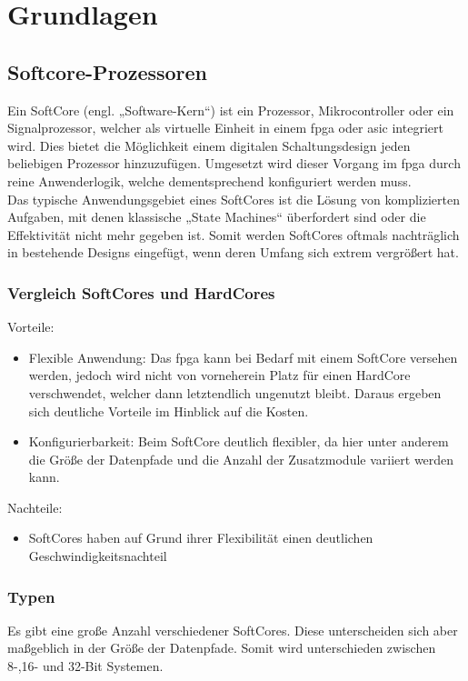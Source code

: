 \chapter{Grundlagen}\label{kap:grundlagen}
\section{Softcore-Prozessoren}\label{kap:softcoreprozessoren}

Ein SoftCore (engl. „Software-Kern“) ist ein Prozessor, Mikrocontroller oder ein Signalprozessor, welcher als virtuelle Einheit in einem \ac{fpga} oder \ac{asic} integriert wird.
Dies bietet die Möglichkeit einem digitalen Schaltungsdesign jeden beliebigen Prozessor hinzuzufügen. Umgesetzt wird dieser Vorgang im \ac{fpga} durch reine Anwenderlogik,
welche dementsprechend konfiguriert werden muss.\\
Das typische Anwendungsgebiet eines SoftCores ist die Lösung von komplizierten Aufgaben, mit denen klassische „State Machines“ überfordert sind oder die Effektivität
 nicht mehr gegeben ist. Somit werden SoftCores oftmals nachträglich in bestehende Designs eingefügt, wenn deren Umfang sich extrem vergrößert hat.\cite{softcore}\\

\subsection{Vergleich SoftCores und HardCores}\label{kap:vergleich}
Vorteile:
\begin{itemize}
   \item Flexible Anwendung: Das \ac{fpga} kann bei Bedarf mit einem SoftCore versehen werden, jedoch wird nicht von vorneherein Platz für einen HardCore verschwendet, welcher
    dann letztendlich ungenutzt bleibt. Daraus ergeben sich deutliche Vorteile im Hinblick auf die Kosten.
    \item Konfigurierbarkeit: Beim SoftCore deutlich flexibler, da hier unter anderem die Größe der Datenpfade und die Anzahl der Zusatzmodule variiert werden kann.
 \end{itemize}


Nachteile:
\begin{itemize}
  \item SoftCores haben auf Grund ihrer Flexibilität einen deutlichen Geschwindigkeitsnachteil
\end{itemize}

\subsection{Typen}\label{kap:typen}
Es gibt eine große Anzahl verschiedener SoftCores. Diese unterscheiden sich aber maßgeblich in der Größe der Datenpfade.
Somit wird unterschieden zwischen 8-,16- und 32-Bit Systemen.\cite{softcore}\\


